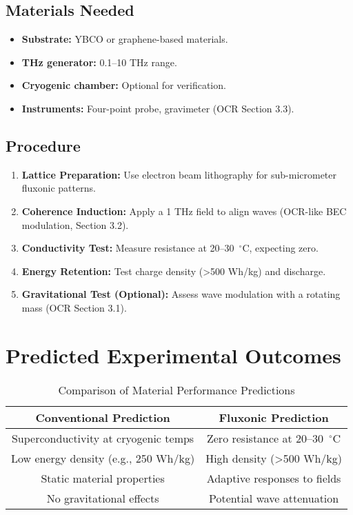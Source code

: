 \documentclass{article}
\begin{document}
\subsection{Materials Needed}
\begin{itemize}
    \item \textbf{Substrate:} YBCO or graphene-based materials.
    \item \textbf{THz generator:} 0.1--10 THz range.
    \item \textbf{Cryogenic chamber:} Optional for verification.
    \item \textbf{Instruments:} Four-point probe, gravimeter (OCR Section 3.3).
\end{itemize}

\subsection{Procedure}
\begin{enumerate}
    \item \textbf{Lattice Preparation:} Use electron beam lithography for sub-micrometer fluxonic patterns.
    \item \textbf{Coherence Induction:} Apply a 1 THz field to align waves (OCR-like BEC modulation, Section 3.2).
    \item \textbf{Conductivity Test:} Measure resistance at 20--30~$^\circ$C, expecting zero.
    \item \textbf{Energy Retention:} Test charge density (>500 Wh/kg) and discharge.
    \item \textbf{Gravitational Test (Optional):} Assess wave modulation with a rotating mass (OCR Section 3.1).
\end{enumerate}

\section{Predicted Experimental Outcomes}
\begin{table}[h]
    \centering
    \begin{tabular}{|c|c|}
        \hline
        \textbf{Conventional Prediction} & \textbf{Fluxonic Prediction} \\
        \hline
        Superconductivity at cryogenic temps & Zero resistance at 20--30~$^\circ$C \\
        Low energy density (e.g., 250 Wh/kg) & High density (>500 Wh/kg) \\
        Static material properties & Adaptive responses to fields \\
        No gravitational effects & Potential wave attenuation \\
        \hline
    \end{tabular}
    \caption{Comparison of Material Performance Predictions}
    \label{tab:predictions}
\end{table}
\end{document}
